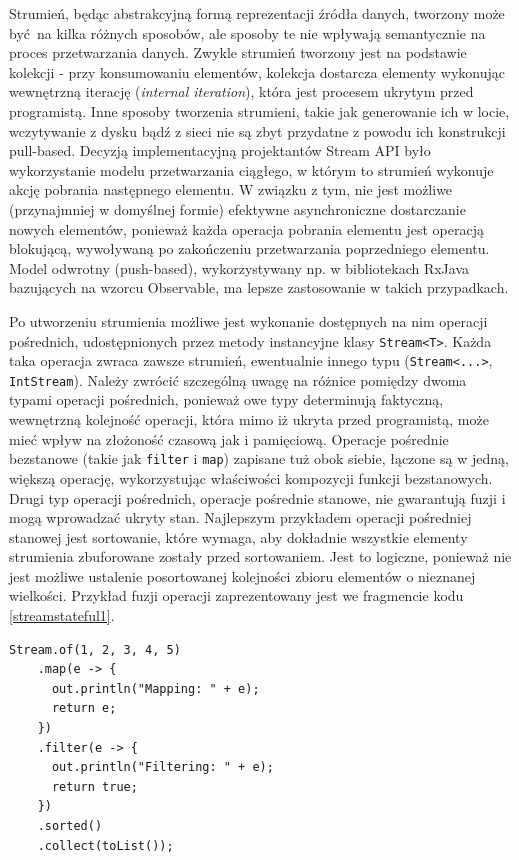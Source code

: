 \documentclass[12pt]{extarticle}
\begin{document}
    Strumień, będąc abstrakcyjną formą reprezentacji źródła danych, tworzony może być na kilka różnych sposobów, ale sposoby te nie wpływają semantycznie na proces przetwarzania danych. Zwykle strumień tworzony jest na podstawie kolekcji - przy konsumowaniu elementów, kolekcja dostarcza elementy wykonując wewnętrzną iterację (\textit{internal iteration}), która jest procesem ukrytym przed programistą. Inne sposoby tworzenia strumieni, takie jak generowanie ich w locie, wczytywanie z dysku bądź z sieci nie są zbyt przydatne z powodu ich konstrukcji pull-based. Decyzją implementacyjną projektantów Stream API było wykorzystanie modelu przetwarzania ciągłego, w którym to strumień wykonuje akcję pobrania następnego elementu. W związku z tym, nie jest możliwe (przynajmniej w domyślnej formie) efektywne asynchroniczne dostarczanie nowych elementów, ponieważ każda operacja pobrania elementu jest operacją blokującą, wywoływaną po zakończeniu przetwarzania poprzedniego elementu. Model odwrotny (push-based), wykorzystywany np. w bibliotekach RxJava bazujących na wzorcu Observable, ma lepsze zastosowanie w takich przypadkach.

    Po utworzeniu strumienia możliwe jest wykonanie dostępnych na nim operacji pośrednich, udostępnionych przez metody instancyjne klasy \texttt{Stream<T>}. Każda taka operacja zwraca zawsze strumień, ewentualnie innego typu (\texttt{Stream<...>}, \texttt{IntStream}). Należy zwrócić szczególną uwagę na różnice pomiędzy dwoma typami operacji pośrednich, ponieważ owe typy determinują faktyczną, wewnętrzną kolejność operacji, która mimo iż ukryta przed programistą, może mieć wpływ na złożoność czasową jak i pamięciową. Operacje pośrednie bezstanowe (takie jak \texttt{filter} i \texttt{map}) zapisane tuż obok siebie, łączone są w jedną, większą operację, wykorzystując właściwości kompozycji funkcji bezstanowych. Drugi typ operacji pośrednich, operacje pośrednie stanowe, nie gwarantują fuzji i mogą wprowadzać ukryty stan. Najlepszym przykładem operacji pośredniej stanowej jest sortowanie, które wymaga, aby dokładnie wszystkie elementy strumienia zbuforowane zostały przed sortowaniem. Jest to logiczne, ponieważ nie jest możliwe ustalenie posortowanej kolejności zbioru elementów o nieznanej wielkości. Przykład fuzji operacji zaprezentowany jest we fragmencie kodu \ref{streamstateful1}.

\begin{lstlisting}[label=streamstateful1, caption=Fuzja operacji bezstanowych]
Stream.of(1, 2, 3, 4, 5)
    .map(e -> {
      out.println("Mapping: " + e);
      return e;
    })
    .filter(e -> {
      out.println("Filtering: " + e);
      return true;
    })
    .sorted()
    .collect(toList());

\end{lstlisting}
\end{document}
